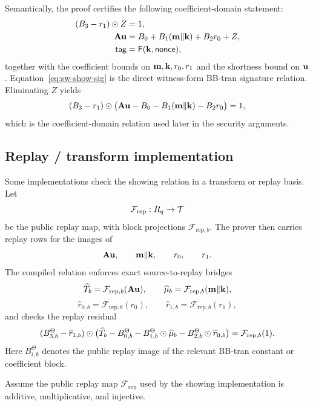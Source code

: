 Semantically, the proof certifies the following coefficient-domain statement:
\begin{align}
  (B_3-r_1)\odot Z&=1, \label{eq:sw-show-inv}\\
  \mathbf{A}\mathbf{u}&=B_0+B_1(\mathbf{m}\Vert\mathbf{k})+B_2r_0+Z, \label{eq:sw-show-sig}\\
  \mathsf{tag}&=\mathsf{F}(\mathbf{k},\mathsf{nonce}), \label{eq:sw-show-prf}
\end{align}
together with the coefficient bounds on $\mathbf{m},\mathbf{k},r_0,r_1$ and the shortness bound on $\mathbf{u}$.
Equation~\eqref{eq:sw-show-sig} is the direct witness-form BB-tran signature relation.  Eliminating $Z$ yields
\begin{equation}
  (B_3-r_1)\odot\bigl(\mathbf{A}\mathbf{u}-B_0-B_1(\mathbf{m}\Vert\mathbf{k})-B_2r_0\bigr)=1,
  \label{eq:sw-show-eliminated}
\end{equation}
which is the coefficient-domain relation used later in the security arguments.

\subsection{Replay / transform implementation}
\label{subsec:replay-implementation}
Some implementations check the showing relation in a transform or replay basis.  Let
\[
  \mathcal F_{\mathrm{rep}}:R_q\to\mathcal T
\]
be the public replay map, with block projections $\mathcal F_{\mathrm{rep},b}$.  The prover then carries replay rows
for the images of
\[
  \mathbf{A}\mathbf{u},
  \qquad
  \mathbf{m}\Vert\mathbf{k},
  \qquad
  r_0,
  \qquad
  r_1.
\]
The compiled relation enforces exact source-to-replay bridges
\[
  \widehat T_b=\mathcal F_{\mathrm{rep},b}(\mathbf{A}\mathbf{u}),
  \qquad
  \widehat\mu_b=\mathcal F_{\mathrm{rep},b}(\mathbf{m}\Vert\mathbf{k}),
\]
\[
  \widehat r_{0,b}=\mathcal F_{\mathrm{rep},b}(r_0),
  \qquad
  \widehat r_{1,b}=\mathcal F_{\mathrm{rep},b}(r_1),
\]
and checks the replay residual
\begin{equation}
  (B_{3,b}^{\Theta}-\widehat r_{1,b})\odot
  \bigl(\widehat T_b-B_{0,b}^{\Theta}-B_{1,b}^{\Theta}\odot \widehat\mu_b-B_{2,b}^{\Theta}\odot\widehat r_{0,b}\bigr)
  =\mathcal F_{\mathrm{rep},b}(1).
  \label{eq:sw-replay-residual}
\end{equation}
Here $B_{i,b}^{\Theta}$ denotes the public replay image of the relevant BB-tran constant or coefficient block.

\begin{lemma}\label{lem:replay-transform}
Assume the public replay map $\mathcal F_{\mathrm{rep}}$ used by the showing implementation is additive,
multiplicative, and injective.
\end{lemma}

